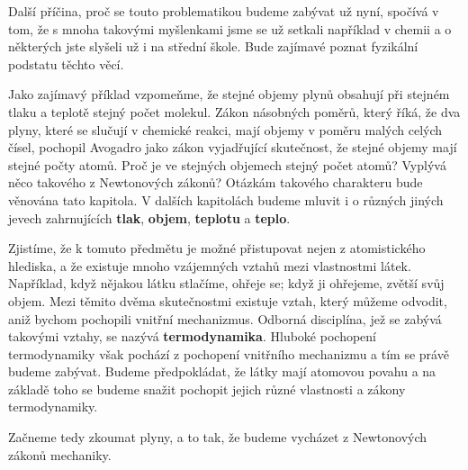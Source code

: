     Další příčina, proč se touto problematikou budeme zabývat už nyní, spočívá v tom, že s mnoha
    takovými myšlenkami jsme se už setkali například v chemii a o některých jste slyšeli už i na
    střední škole. Bude zajímavé poznat fyzikální podstatu těchto věcí.
    
    Jako zajímavý příklad vzpomeňme, že stejné objemy plynů obsahují při stejném tlaku a teplotě
    stejný počet molekul. Zákon násobných poměrů, který říká, že dva plyny, které se slučují v
    chemické reakci, mají objemy v poměru malých celých čísel, pochopil Avogadro jako zákon
    vyjadřující skutečnost, že stejné objemy mají stejné počty atomů. Proč je ve stejných objemech
    stejný počet atomů? Vyplývá něco takového z Newtonových zákonů? Otázkám takového charakteru bude
    věnována tato kapitola. V dalších kapitolách budeme mluvit i o různých jiných jevech
    zahrnujících \textbf{tlak}, \textbf{objem}, \textbf{teplotu} a \textbf{teplo}. 
    
    Zjistíme, že k tomuto předmětu je možné přistupovat nejen z atomistického hlediska, a že
    existuje mnoho vzájemných vztahů mezi vlastnostmi látek. Například, když nějakou látku stlačíme,
    ohřeje se; když ji ohřejeme, zvětší svůj objem. Mezi těmito dvěma skutečnostmi existuje vztah,
    který můžeme odvodit, aniž bychom pochopili vnitřní mechanizmus. Odborná disciplína, jež se
    zabývá takovými vztahy, se nazývá \textbf{termodynamika}. Hluboké pochopení termodynamiky však
    pochází z pochopení vnitřního mechanizmu a tím se právě budeme zabývat. Budeme předpokládat, že
    látky mají atomovou povahu a na základě toho se budeme snažit pochopit jejich různé vlastnosti a
    zákony termodynamiky.
    
    Začneme tedy zkoumat plyny, a to tak, že budeme vycházet z Newtonových zákonů mechaniky.
    
